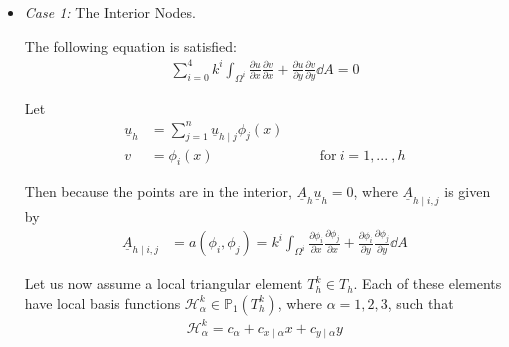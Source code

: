\begin{enumerate}[label=(\alph*),leftmargin=*,itemsep=0mm]
    \begin{itemize}
        
        \item \textit{Case 1:} The Interior Nodes.
        
        The following equation is satisfied:
        \begin{align*}
            \sum_{i=0}^4 k^i \int_{\Omega^i} \frac{\partial{u}}{\partial{x}} \frac{\partial{v}}{\partial{x}}
            + \frac{\partial{u}}{\partial{y}} \frac{\partial{v}}{\partial{y}} \dd{A} = 0
        \end{align*}
        
        Let
        \begin{align*}
            \underline{u}_h &= \sum_{j=1}^n \underline{u}_{h\mid j} \phi_j(x) \\
            v &= \phi_i(x) && \quad \text{for}\> i=1, ...\>, h
        \end{align*}
        
        Then because the points are in the interior, $\underline{A}_h\underline{u}_h = 0$, where $\underline{A}_{h\mid i,j}$ is given by
        \begin{align}
            \underline{A}_{h\mid i,j} &= a(\phi_i,\phi_j)
            = k^i \int_{\Omega^i} \frac{\partial{\phi_i}}{\partial{x}} \frac{\partial{\phi_j}}{\partial{x}}
            + \frac{\partial{\phi_i}}{\partial{y}} \frac{\partial{\phi_j}}{\partial{y}} \dd{A}
        \end{align}
        
        Let us now assume a local triangular element $T_h^k \in T_h$.  Each of these elements have local basis functions $\mathcal{H}_\alpha^k \in \mathbb{P}_1(T_h^k)$, where $\alpha = 1,2,3$, such that
        \begin{align*}
            \mathcal{H}_\alpha^k = c_\alpha + c_{x\mid\alpha}x + c_{y\mid\alpha}y
        \end{align*}
        

\end{itemize}
\end{enumerate}
